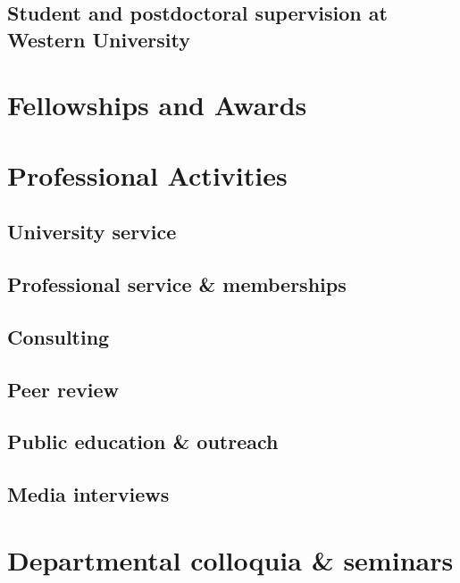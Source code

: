 \documentclass[12pt]{article}
\begin{document}
\subsection{Student and postdoctoral supervision at Western University}


\section{Fellowships and Awards}


\section{Professional Activities}

\subsection{University service}


\subsection{Professional service \& memberships}


\subsection{Consulting}


\subsection{Peer review}


\subsection{Public education \& outreach}


\subsection{Media interviews}


\clearpage
\section{Departmental colloquia \& seminars}


\clearpage

\begin{publications}

\printbibliography[title={Submitted refereed publications},keyword=submit]

\printbibliography[title={Refereed publications},keyword=ref]

\setcounter{papers}{0}
\printbibliography[title={Conference presentations},keyword=unref]


\end{publications}
\end{document}
